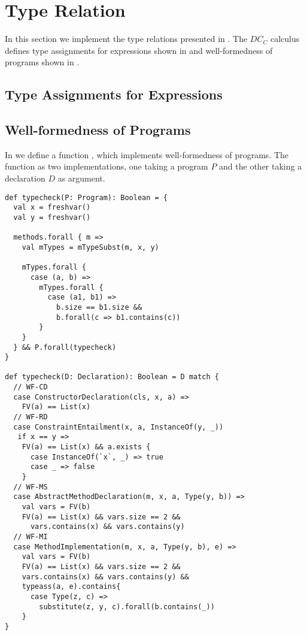 \section{Type Relation}
In this section we implement the type relations presented in .
The $DC_C$ calculus defines type assignments for expressions
shown in 
and well-formedness of programs shown in .

\subsection{Type Assignments for Expressions}

\subsection{Well-formedness of Programs}
In  we define a function ,
which implements well-formedness of programs.
The function as two implementations,
one taking a program $P$
and the other taking a declaration $D$
as argument.

\begin{lstlisting}[caption={Well-formedness},label=lst:wf,captionpos=b,frame={lines}]
def typecheck(P: Program): Boolean = {
  val x = freshvar()
  val y = freshvar()

  methods.forall { m =>
    val mTypes = mTypeSubst(m, x, y)

    mTypes.forall {
      case (a, b) =>
        mTypes.forall {
          case (a1, b1) =>
            b.size == b1.size &&
            b.forall(c => b1.contains(c))
        }
    }
  } && P.forall(typecheck)
}

def typecheck(D: Declaration): Boolean = D match {
  // WF-CD
  case ConstructorDeclaration(cls, x, a) =>
    FV(a) == List(x)
  // WF-RD
  case ConstraintEntailment(x, a, InstanceOf(y, _))
   if x == y =>
    FV(a) == List(x) && a.exists {
      case InstanceOf(`x`, _) => true
      case _ => false
    }
  // WF-MS
  case AbstractMethodDeclaration(m, x, a, Type(y, b)) =>
    val vars = FV(b)
    FV(a) == List(x) && vars.size == 2 &&
      vars.contains(x) && vars.contains(y)
  // WF-MI
  case MethodImplementation(m, x, a, Type(y, b), e) =>
    val vars = FV(b)
    FV(a) == List(x) && vars.size == 2 &&
    vars.contains(x) && vars.contains(y) &&
    typeass(a, e).contains{
      case Type(z, c) =>
        substitute(z, y, c).forall(b.contains(_))
    }
}
\end{lstlisting}

